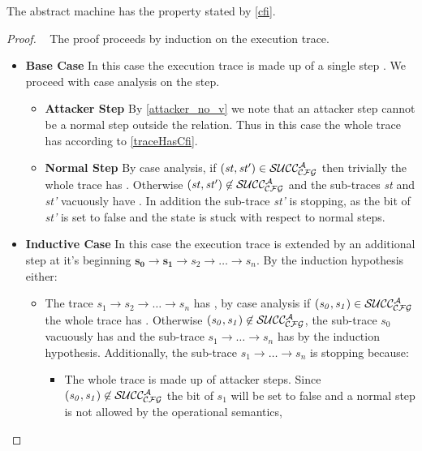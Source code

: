 \begin{theorem}\label{CFIabstract}
The abstract machine has the \CFI property stated by \cref{cfi}.
\end{theorem}

\begin{proof} 
  ~ The proof proceeds by induction on the execution trace.
  \begin{itemize}
  \item \textbf{Base Case} In this case the execution trace is made up
    of a single step . We proceed with case analysis on
    the step.
    \begin{itemize}
    \item \textbf{Attacker Step} By \cref{attacker_no_v} we
      note that an attacker step cannot be a normal step outside the
       relation. Thus in this case the whole trace has \CFI
      according to \cref{traceHasCfi}.
    \item \textbf{Normal Step} By case analysis, if
      $(\mathit{st},\mathit{st'}) \in \mathcal{SUCC_\mathcal{CFG}^{A}}$ then trivially the
      whole trace has \CFI. Otherwise $(\mathit{st},\mathit{st'}) \not
      \in \mathcal{SUCC_\mathcal{CFG}^{A}}$ and the sub-traces \textit{st} and \textit{st'}
      vacuously have \CFI. In addition the sub-trace \textit{st'} is
      stopping, as the \ok bit of \textit{st'} is set to false and the
      state is stuck with respect to normal steps.
    \end{itemize}
  \item \textbf{Inductive Case} In this case the execution trace is
    extended by an additional step at it's beginning
    $\mathbf{s_0 \to s_1} \to s_2 \to \ldots \to s_n$. 
    By the induction hypothesis either:
    \begin{itemize}
    \item The trace $s_1 \to s_2 \to \ldots \to s_n$ has \CFI, by case
      analysis if $(\mathit{s_0},\mathit{s_1}) \in \mathcal{SUCC_\mathcal{CFG}^{A}}$ the
      whole trace has \CFI. Otherwise $(\mathit{s_0},\mathit{s_1})
      \not \in \mathcal{SUCC_\mathcal{CFG}^{A}}$, the sub-trace $s_0$ vacuously has \CFI and
      the sub-trace $s_1 \to \ldots \to s_n$ has \CFI by the induction
      hypothesis. Additionally, the sub-trace $s_1 \to \ldots \to s_n$
      is stopping because:
      \begin{itemize}
        \item The whole trace is made up of attacker steps.
           Since $(\mathit{s_0},\mathit{s_1}) \not \in \mathcal{SUCC_\mathcal{CFG}^{A}}$
           the \ok bit of $s_1$ will be set to false and a normal
           step is not allowed by the operational semantics,

\end{itemize}
\end{itemize}
\end{itemize}
\end{proof}
